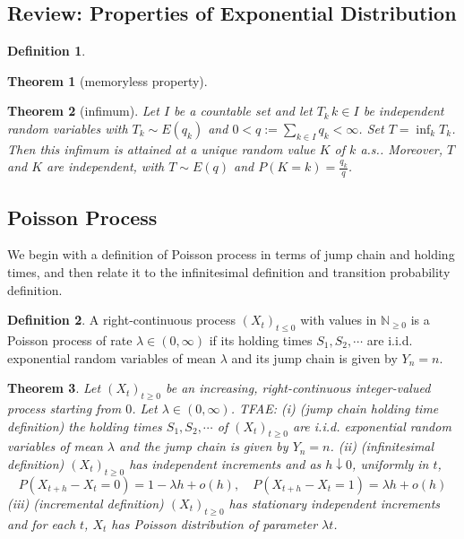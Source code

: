 \documentclass{article}
\newtheorem{Thm}{Theorem}[section]
\theoremstyle{definition}
\newtheorem{Def}{Definition}[section]
\begin{document}
\subsection{Review: Properties of Exponential Distribution}
\begin{Def}
    
\end{Def}
\begin{Thm}[memoryless property]
    
\end{Thm}
\begin{Thm}[infimum]
    Let $I$ be a countable set and let $T_k\,k\in I$ be independent random variables with $T_k \sim E(q_k)$ and $0 < q := \sum_{k\in I} q_k < \infty$. 
    Set $T = \inf_k T_k$. Then this infimum is attained at a unique random value $K$ of $k$ a.s.. Moreover, $T$ and $K$ are independent, with $T \sim E(q)$ and $P(K = k) = \frac{q_k}{q}$.

\end{Thm}

\subsection{Poisson Process}

We begin with a definition of Poisson process in terms of jump chain and holding times, and then relate it to
the infinitesimal definition and transition probability definition.
\begin{Def}
    A right-continuous process $(X_t)_{t\le 0}$ with values in $\mathbb{N}_{\ge 0}$ is a Poisson process of rate $\lambda\in (0,\infty)$
    if its holding times $S_1,S_2,\cdots$ are i.i.d. exponential random variables of mean $\lambda$ and its jump chain is given by $Y_n=n$.
\end{Def}

\begin{Thm}
    Let $(X_t)_{t\ge 0}$ be an increasing, right-continuous integer-valued process starting from $0$. Let $\lambda\in(0,\infty)$. TFAE:\newline 
    (i) (jump chain holding time definition) the holding times $S_1,S_2,\cdots$ of $(X_t)_{t\ge 0}$ are i.i.d. exponential random variables of mean $\lambda$ 
    and the jump chain is given by $Y_n=n$.\newline 
    (ii) (infinitesimal definition) $(X_t)_{t\ge 0}$ has independent increments and as $h\downarrow 0$, uniformly in $t$,
    \[P(X_{t+h}-X_t=0)=1-\lambda h+o(h),\quad P(X_{t+h}-X_t=1)=\lambda h+o(h)\]\newline 
    (iii) (incremental definition) $(X_t)_{t\ge 0}$ has stationary independent increments and for each $t$, $X_t$ has Poisson distribution of parameter $\lambda t$.
\end{Thm}
\end{document}
